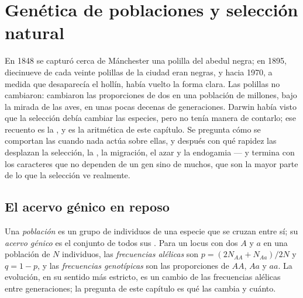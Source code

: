 \chapter{Genética de poblaciones y selección natural}\label{ch:b2:population-genetics}

En 1848 se capturó cerca de Mánchester una polilla del abedul negra; en
1895, diecinueve de cada veinte polillas de la ciudad eran negras, y hacia
1970, a medida que desaparecía el hollín, había vuelto la forma clara. Las
polillas no cambiaron: cambiaron las proporciones de dos  en una
población de millones, bajo la mirada de las aves, en unas pocas decenas
de generaciones. Darwin había visto que la selección debía cambiar las
especies, pero no tenía manera de contarlo; ese recuento es la , y es la aritmética de este capítulo. Se pregunta cómo se
comportan las  cuando nada actúa sobre ellas, y
después con qué rapidez las desplazan la selección, la , la
migración, el azar y la endogamia --- y termina con los caracteres que no
dependen de un gen sino de muchos, que son la mayor parte de lo que la
selección ve realmente.

\section{El acervo génico en reposo}

\begin{definition}\label{def:b2:population-genetics:frequencies}
Una \emph{población} es un grupo de individuos de una especie que se
cruzan entre sí; su \emph{acervo génico} es el conjunto de todos sus
. Para un locus con dos  $A$ y $a$ en una población 
de $N$ individuos, las \emph{frecuencias alélicas} son $p = (2N_{AA} +
N_{Aa})/2N$ y $q = 1 - p$, y las \emph{frecuencias genotípicas} son las
proporciones de $AA$, $Aa$ y $aa$. La evolución, en su sentido más
estricto, es un cambio de las frecuencias alélicas entre generaciones; la
pregunta de este capítulo es qué las cambia y cuánto.
\end{definition}

